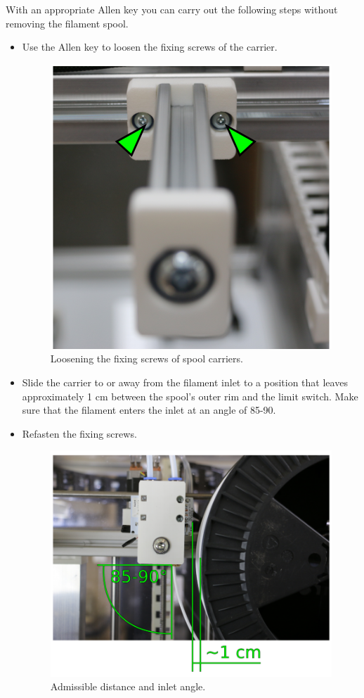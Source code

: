 \begin{info}
  With an appropriate Allen key you can carry out the following steps without removing the filament spool.
\end{info}
\begin{itemize}
  \item Use the Allen key to loosen the fixing screws of the carrier.

  \begin{figure}[H]
    \centering
    \includegraphics[width=.7\linewidth]{./img/mtc_filamentmovespools.png}
    \caption{Loosening the fixing screws of spool carriers.}
  \end{figure}

  \item Slide the carrier to or away from the filament inlet to a position that 
        leaves approximately 1 cm between the spool's outer rim and the limit switch. Make sure that the filament enters the inlet at an angle 
        of 85-90\degree.
  \item Refasten the fixing screws.

  \begin{figure}[H]
    \centering
    \includegraphics[width=.7\linewidth]{./img/mtc_filamentinletmeasures.png}
    \caption{Admissible distance and inlet angle.}
  \end{figure}

\end{itemize}


